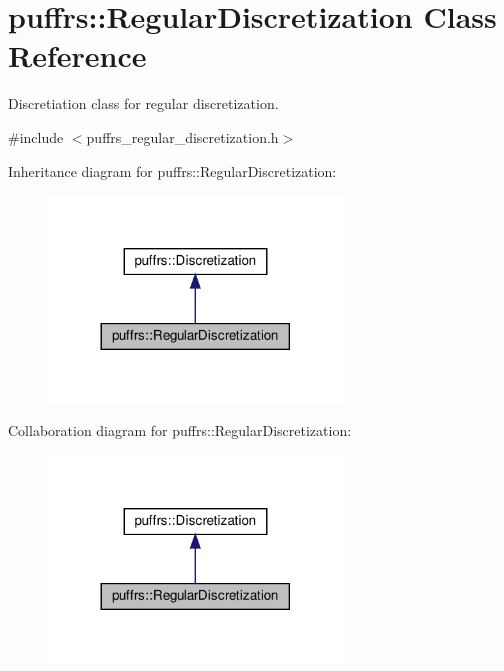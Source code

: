\hypertarget{classpuffrs_1_1RegularDiscretization}{}\section{puffrs\+:\+:Regular\+Discretization Class Reference}
\label{classpuffrs_1_1RegularDiscretization}


Discretiation class for regular discretization.  




{\ttfamily \#include $<$puffrs\+\_\+regular\+\_\+discretization.\+h$>$}



Inheritance diagram for puffrs\+:\+:Regular\+Discretization\+:
\nopagebreak
\begin{figure}[H]
\begin{center}
\leavevmode
\includegraphics[width=221pt]{classpuffrs_1_1RegularDiscretization__inherit__graph}
\end{center}
\end{figure}


Collaboration diagram for puffrs\+:\+:Regular\+Discretization\+:
\nopagebreak
\begin{figure}[H]
\begin{center}
\leavevmode
\includegraphics[width=221pt]{classpuffrs_1_1RegularDiscretization__coll__graph}
\end{center}
\end{figure}
